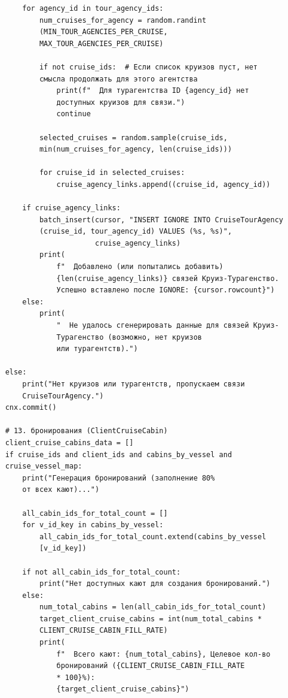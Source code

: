 \documentclass[11pt,a4paper,final]{article}
\begin{document}
{\begin{verbatim}
        for agency_id in tour_agency_ids:
            num_cruises_for_agency = random.randint
            (MIN_TOUR_AGENCIES_PER_CRUISE, 
            MAX_TOUR_AGENCIES_PER_CRUISE)

            if not cruise_ids:  # Если список круизов пуст, нет
            смысла продолжать для этого агентства
                print(f"  Для турагентства ID {agency_id} нет
                доступных круизов для связи.")
                continue

            selected_cruises = random.sample(cruise_ids,
            min(num_cruises_for_agency, len(cruise_ids)))

            for cruise_id in selected_cruises:
                cruise_agency_links.append((cruise_id, agency_id))

        if cruise_agency_links:
            batch_insert(cursor, "INSERT IGNORE INTO CruiseTourAgency
            (cruise_id, tour_agency_id) VALUES (%s, %s)",
                         cruise_agency_links)
            print(
                f"  Добавлено (или попытались добавить)
                {len(cruise_agency_links)} связей Круиз-Турагенство.
                Успешно вставлено после IGNORE: {cursor.rowcount}")
        else:
            print(
                "  Не удалось сгенерировать данные для связей Круиз-
                Турагенство (возможно, нет круизов
                или турагентств).")

    else:
        print("Нет круизов или турагентств, пропускаем связи 
        CruiseTourAgency.")
    cnx.commit()

    # 13. бронирования (ClientCruiseCabin)
    client_cruise_cabins_data = []
    if cruise_ids and client_ids and cabins_by_vessel and
    cruise_vessel_map:
        print("Генерация бронирований (заполнение 80% 
        от всех кают)...")

        all_cabin_ids_for_total_count = []
        for v_id_key in cabins_by_vessel:
            all_cabin_ids_for_total_count.extend(cabins_by_vessel
            [v_id_key])

        if not all_cabin_ids_for_total_count:
            print("Нет доступных кают для создания бронирований.")
        else:
            num_total_cabins = len(all_cabin_ids_for_total_count)
            target_client_cruise_cabins = int(num_total_cabins *
            СLIENT_CRUISE_CABIN_FILL_RATE)
            print(
                f"  Всего кают: {num_total_cabins}, Целевое кол-во
                бронирований ({СLIENT_CRUISE_CABIN_FILL_RATE
                * 100}%):
                {target_client_cruise_cabins}")


\end{verbatim}}
\end{document}
